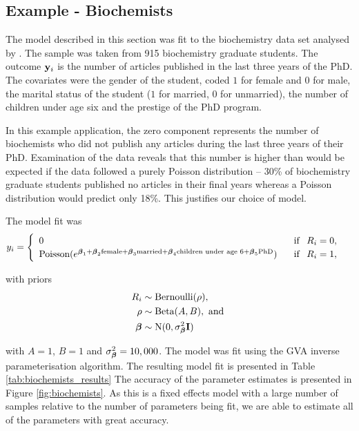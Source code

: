 			\subsection{Example - Biochemists}
			The model described in this section was fit to the biochemistry data set analysed by
			\cite{10.2307/2579146}. The sample was taken from 915 biochemistry graduate students. The outcome
			${\bf y}_i$ is the number of articles published in the last three years of the PhD. The covariates were the
			gender of the student, coded $1$ for female and $0$ for male, the marital status of the student ($1$ for
			married, $0$ for unmarried), the number of children under age six and the prestige of the PhD program.

			In this example application, the zero component represents the number of biochemists who did not publish
			any articles during the last three years of their PhD. Examination of the data reveals that this number
			is higher than would be expected if the data followed a purely Poisson distribution -- 30\% of
			biochemistry graduate students published no articles in their final years whereas a Poisson distribution
			would predict only 18\%. This justifies our choice of model.

			The model fit was
			\[
				y_i = \begin{cases}
				\begin{array}{ll}
				0 &\phantom{-} \text{if} \phantom{-} R_i = 0, \\
				\text{Poisson}(e^{{\boldsymbol \beta}_1 + {\boldsymbol \beta}_2 \text{female} + {\boldsymbol \beta}_3 \text{married} + {\boldsymbol \beta}_4 \text{children under age 6} + {\boldsymbol \beta}_5 \text{PhD}}) &\phantom{-} \text{if} \phantom{-} R_i = 1,
				\end{array}
				\end{cases}
			\]


			\noindent with priors
			\begin{align*}
			R_i &\sim \text{Bernoulli}(\rho), \\
			\rho &\sim \text{Beta}(A, B), \text { and } \\
			{\boldsymbol \beta} &\sim \text{N}(0, \sigma_{\boldsymbol \beta}^2 {\bf I})
			\end{align*}

			\noindent with $A=1$, $B=1$ and $\sigma_{\boldsymbol \beta}^2 = 10,000$. The model was fit using the GVA inverse parameterisation algorithm. The resulting model fit is presented in Table \ref{tab:biochemists_results}
			The accuracy of the parameter estimates is presented in Figure
			\ref{fig:biochemists}. As this is a fixed effects model with a large number of samples relative to the
			number of parameters being fit, we are able to estimate all of the parameters with great accuracy.

